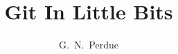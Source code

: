 \documentclass[12pt,epsfig,epsf]{article}
\begin{document}
\linenumbers

\title{Git In Little Bits}

\author[1]{G.~N.~Perdue}
\affil[1]{\FNAL}

\maketitle





%
\end{document}
